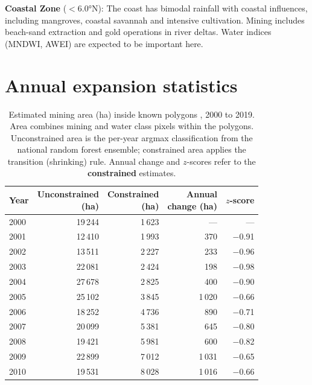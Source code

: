 \documentclass[]{interact}
\begin{document}
\textbf{Coastal Zone} ($<$6.0°N): The coast has bimodal rainfall with
coastal influences, including mangroves, coastal savannah and intensive
cultivation. Mining includes beach-sand extraction and gold operations in
river deltas. Water indices (MNDWI, AWEI) are expected to be important here.

\section{Annual expansion statistics}
\label{app:annual}

\begin{table}[H]
  \centering
  \small
  \caption{Estimated mining area (ha) inside known polygons
  \citep{maus2022update}, 2000 to 2019. Area combines mining and water class
  pixels within the polygons. Unconstrained area is the per-year argmax
  classification from the national random forest ensemble; constrained area
  applies the transition (shrinking) rule. Annual change and $z$-scores refer
  to the \textbf{constrained} estimates.}
  \label{tab:mining_footprint_temporal}
  \begin{threeparttable}
    \setlength{\tabcolsep}{6pt}
    \begin{tabular}{@{}lrrrr@{}}
      \toprule
      Year & \makecell[r]{Unconstrained\\(ha)} & \makecell[r]{Constrained\\(ha)} & \makecell[r]{Annual\\change (ha)} & $z$-score\tnote{a} \\
      \midrule
      2000 & 19\,244 & 1\,623 & --- & --- \\
      2001 & 12\,410 & 1\,993 & 370 & $-$0.91 \\
      2002 & 13\,511 & 2\,227 & 233 & $-$0.96 \\
      2003 & 22\,081 & 2\,424 & 198 & $-$0.98 \\
      2004 & 27\,678 & 2\,825 & 400 & $-$0.90 \\
      2005 & 25\,102 & 3\,845 & 1\,020 & $-$0.66 \\
      2006 & 18\,252 & 4\,736 & 890 & $-$0.71 \\
      2007 & 20\,099 & 5\,381 & 645 & $-$0.80 \\
      2008 & 19\,421 & 5\,981 & 600 & $-$0.82 \\
      2009 & 22\,899 & 7\,012 & 1\,031 & $-$0.65 \\
      2010 & 19\,531 & 8\,028 & 1\,016 & $-$0.66 \\

\end{tabular}
\end{threeparttable}
\end{table}
\end{document}

